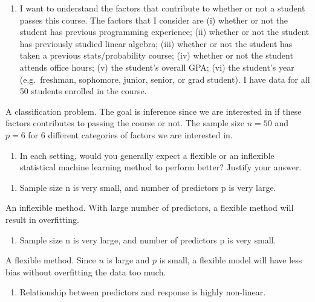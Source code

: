 \documentclass[]{article}
\providecommand{\tightlist}{%
  \setlength{\itemsep}{0pt}\setlength{\parskip}{0pt}}
\begin{document}
\begin{enumerate}
\def\labelenumi{(\alph{enumi})}
\setcounter{enumi}{1}
\tightlist
\item
  I want to understand the factors that contribute to whether or not a
  student passes this course. The factors that I consider are (i)
  whether or not the student has previous programming experience; (ii)
  whether or not the student has previously studied linear algebra;
  (iii) whether or not the student has taken a previous
  stats/probability course; (iv) whether or not the student attends
  office hours; (v) the student's overall GPA; (vi) the student's year
  (e.g.~freshman, sophomore, junior, senior, or grad student). I have
  data for all 50 students enrolled in the course.
\end{enumerate}

A classification problem. The goal is inference since we are interested
in if these factors contributes to passing the course or not. The sample
size \(n=50\) and \(p=6\) for 6 different categories of factors we are
interested in.

\begin{enumerate}
\def\labelenumi{\arabic{enumi}.}
\setcounter{enumi}{3}
\tightlist
\item
  In each setting, would you generally expect a flexible or an
  inflexible statistical machine learning method to perform better?
  Justify your answer.
\end{enumerate}

\begin{enumerate}
\def\labelenumi{(\alph{enumi})}
\tightlist
\item
  Sample size n is very small, and number of predictors p is very large.
\end{enumerate}

An inflexible method. With large number of predictors, a flexible method
will result in overfitting.

\begin{enumerate}
\def\labelenumi{(\alph{enumi})}
\setcounter{enumi}{1}
\tightlist
\item
  Sample size n is very large, and number of predictors p is very small.
\end{enumerate}

A flexible method. Since \(n\) is large and \(p\) is small, a flexible
model will have less bias without overfitting the data too much.

\begin{enumerate}
\def\labelenumi{(\alph{enumi})}
\setcounter{enumi}{2}
\tightlist
\item
  Relationship between predictors and response is highly non-linear.
\end{enumerate}
\end{document}
